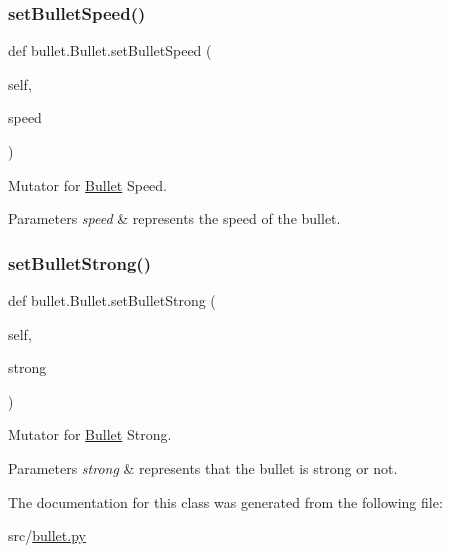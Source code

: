 \subsubsection{\texorpdfstring{setBulletSpeed()}{setBulletSpeed()}}
{\footnotesize\ttfamily def bullet.\+Bullet.\+set\+Bullet\+Speed (\begin{DoxyParamCaption}\item[{}]{self,  }\item[{}]{speed }\end{DoxyParamCaption})}



Mutator for \mbox{\hyperlink{classbullet_1_1_bullet}{Bullet}} Speed. 


\begin{DoxyParams}{Parameters}
{\em speed} & represents the speed of the bullet. \\
\hline
\end{DoxyParams}
\mbox{\label{classbullet_1_1_bullet_ab6e99051563698d883e2f8f8c003e949}} 
\subsubsection{\texorpdfstring{setBulletStrong()}{setBulletStrong()}}
{\footnotesize\ttfamily def bullet.\+Bullet.\+set\+Bullet\+Strong (\begin{DoxyParamCaption}\item[{}]{self,  }\item[{}]{strong }\end{DoxyParamCaption})}



Mutator for \mbox{\hyperlink{classbullet_1_1_bullet}{Bullet}} Strong. 


\begin{DoxyParams}{Parameters}
{\em strong} & represents that the bullet is strong or not. \\
\hline
\end{DoxyParams}


The documentation for this class was generated from the following file\+:\begin{DoxyCompactItemize}
\item 
src/\mbox{\hyperlink{bullet_8py}{bullet.\+py}}\end{DoxyCompactItemize}
